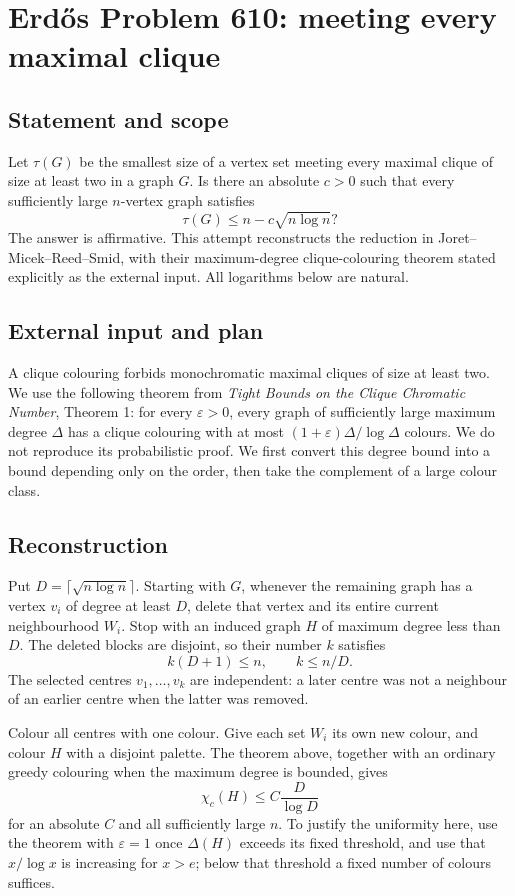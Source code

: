 \section{Erd\H{o}s Problem 610: meeting every maximal clique}
\subsection*{Statement and scope}
Let $\tau(G)$ be the smallest size of a vertex set meeting every maximal clique of size at least two in a graph $G$. Is there an absolute $c>0$ such that every sufficiently large $n$-vertex graph satisfies
\[
 \tau(G)\le n-c\sqrt{n\log n}?
\]
The answer is affirmative. This attempt reconstructs the reduction in Joret--Micek--Reed--Smid, with their maximum-degree clique-colouring theorem stated explicitly as the external input. All logarithms below are natural.

\subsection*{External input and plan}
A clique colouring forbids monochromatic maximal cliques of size at least two. We use the following theorem from \emph{Tight Bounds on the Clique Chromatic Number}, Theorem 1: for every $\varepsilon>0$, every graph of sufficiently large maximum degree $\Delta$ has a clique colouring with at most $(1+\varepsilon)\Delta/\log\Delta$ colours. We do not reproduce its probabilistic proof.
We first convert this degree bound into a bound depending only on the order, then take the complement of a large colour class.

\subsection*{Reconstruction}
Put $D=\lceil\sqrt{n\log n}\rceil$. Starting with $G$, whenever the remaining graph has a vertex $v_i$ of degree at least $D$, delete that vertex and its entire current neighbourhood $W_i$. Stop with an induced graph $H$ of maximum degree less than $D$. The deleted blocks are disjoint, so their number $k$ satisfies
\[
 k(D+1)\le n,\qquad k\le n/D.
\]
The selected centres $v_1,\ldots,v_k$ are independent: a later centre was not a neighbour of an earlier centre when the latter was removed.

Colour all centres with one colour. Give each set $W_i$ its own new colour, and colour $H$ with a disjoint palette. The theorem above, together with an ordinary greedy colouring when the maximum degree is bounded, gives
\[
 \chi_c(H)\le C\frac D{\log D}
\]
for an absolute $C$ and all sufficiently large $n$. To justify the uniformity here, use the theorem with $\varepsilon=1$ once $\Delta(H)$ exceeds its fixed threshold, and use that $x/\log x$ is increasing for $x>e$; below that threshold a fixed number of colours suffices.

